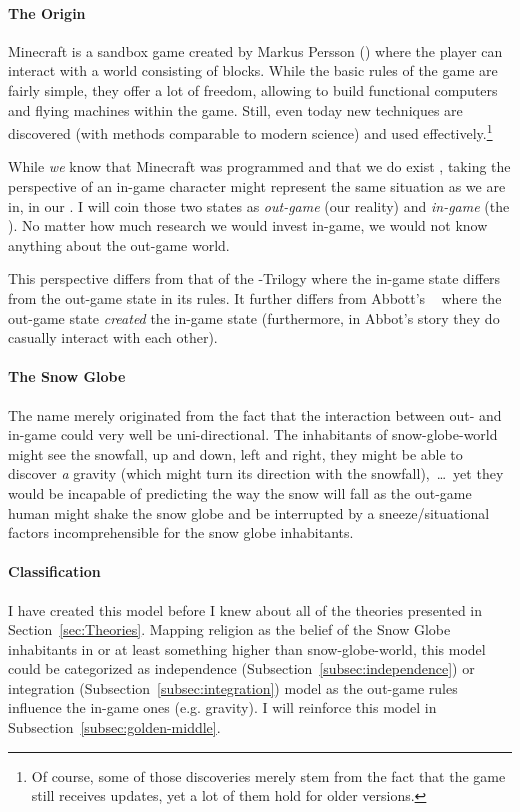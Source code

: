 \paragraph{The Origin} Minecraft is a sandbox game created by Markus Persson () where the player can interact with a world consisting of blocks. While the basic rules of the game are fairly simple, they offer a lot of freedom, allowing to build functional computers and flying machines within the game. Still, even today new techniques are discovered (with methods comparable to modern science) and used effectively.\footnote{Of course, some of those discoveries merely stem from the fact that the game still receives updates, yet a lot of them hold for older versions.}

While \emph{we} know that Minecraft was programmed and that we do exist , taking the perspective of an in-game character might represent the same situation as we are in, in our . I will coin those two states as \emph{out-game} (our reality) and \emph{in-game} (the ).
No matter how much research we would invest in-game, we would not know anything about the out-game world.

This perspective differs from that of the -Trilogy where the in-game state differs from the out-game state in its rules.
It further differs from Abbott's ~\cite{abbott1987flatland} where the out-game state \emph{created} the in-game state (furthermore, in Abbot's story they do casually interact with each other).

\paragraph{The Snow Globe}
The name  merely originated from the fact that the interaction between out- and in-game could very well be uni-directional.
The inhabitants of snow-globe-world might see the snowfall, up and down, left and right, they might be able to discover \textit{a} gravity (which might turn its direction with the snowfall),~\ldots\ yet they would be incapable of predicting the way the snow will fall as the out-game human might shake the snow globe and be interrupted by a sneeze/situational factors incomprehensible for the snow globe inhabitants.


\paragraph{Classification}
I have created this model before I knew about all of the theories presented in Section~\ref{sec:Theories}. Mapping religion as the belief of the Snow Globe inhabitants in  or at least something higher than snow-globe-world, this model could be categorized as independence (Subsection~\ref{subsec:independence}) or integration (Subsection~\ref{subsec:integration}) model as the out-game rules influence the in-game ones (e.g. gravity).
I will reinforce this model in Subsection~\ref{subsec:golden-middle}.

